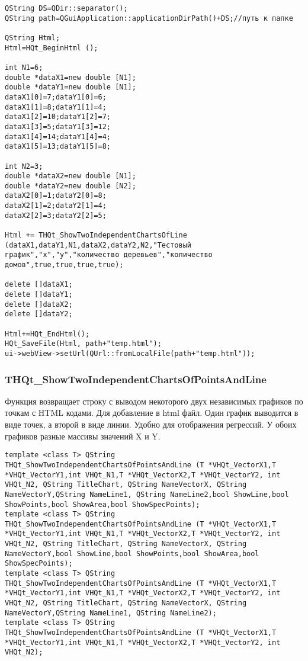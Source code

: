 \documentclass[a4paper,12pt]{article}
\begin{document}
\begin{lstlisting}[label=code_use_THQt_ShowTwoIndependentChartsOfLine,caption=Пример использования]
QString DS=QDir::separator();
QString path=QGuiApplication::applicationDirPath()+DS;//путь к папке

QString Html;
Html=HQt_BeginHtml ();

int N1=6;
double *dataX1=new double [N1];
double *dataY1=new double [N1];
dataX1[0]=7;dataY1[0]=6;
dataX1[1]=8;dataY1[1]=4;
dataX1[2]=10;dataY1[2]=7;
dataX1[3]=5;dataY1[3]=12;
dataX1[4]=14;dataY1[4]=4;
dataX1[5]=13;dataY1[5]=8;

int N2=3;
double *dataX2=new double [N1];
double *dataY2=new double [N2];
dataX2[0]=1;dataY2[0]=8;
dataX2[1]=2;dataY2[1]=4;
dataX2[2]=3;dataY2[2]=5;

Html += THQt_ShowTwoIndependentChartsOfLine (dataX1,dataY1,N1,dataX2,dataY2,N2,"Тестовый график","x","y","количество деревьев","количество домов",true,true,true,true);

delete []dataX1;
delete []dataY1;
delete []dataX2;
delete []dataY2;

Html+=HQt_EndHtml();
HQt_SaveFile(Html, path+"temp.html");
ui->webView->setUrl(QUrl::fromLocalFile(path+"temp.html"));
\end{lstlisting}

\subsubsection{THQt\_ShowTwoIndependentChartsOfPointsAndLine}\label{THQt_ShowTwoIndependentChartsOfPointsAndLine}

Функция возвращает строку с выводом некоторого двух независимых графиков по точкам с HTML кодами. Для добавление в html файл. Один график выводится в виде точек, а второй в виде линии. Удобно для отображения регрессий. У обоих графиков разные массивы значений X и Y.


\begin{lstlisting}[label=code_syntax_THQt_ShowTwoIndependentChartsOfPointsAndLine,caption=Синтаксис]
template <class T> QString THQt_ShowTwoIndependentChartsOfPointsAndLine (T *VHQt_VectorX1,T *VHQt_VectorY1,int VHQt_N1,T *VHQt_VectorX2,T *VHQt_VectorY2, int VHQt_N2, QString TitleChart, QString NameVectorX, QString NameVectorY,QString NameLine1, QString NameLine2,bool ShowLine,bool ShowPoints,bool ShowArea,bool ShowSpecPoints);
template <class T> QString THQt_ShowTwoIndependentChartsOfPointsAndLine (T *VHQt_VectorX1,T *VHQt_VectorY1,int VHQt_N1,T *VHQt_VectorX2,T *VHQt_VectorY2, int VHQt_N2, QString TitleChart, QString NameVectorX, QString NameVectorY,bool ShowLine,bool ShowPoints,bool ShowArea,bool ShowSpecPoints);
template <class T> QString THQt_ShowTwoIndependentChartsOfPointsAndLine (T *VHQt_VectorX1,T *VHQt_VectorY1,int VHQt_N1,T *VHQt_VectorX2,T *VHQt_VectorY2, int VHQt_N2, QString TitleChart, QString NameVectorX, QString NameVectorY,QString NameLine1, QString NameLine2);
template <class T> QString THQt_ShowTwoIndependentChartsOfPointsAndLine (T *VHQt_VectorX1,T *VHQt_VectorY1,int VHQt_N1,T *VHQt_VectorX2,T *VHQt_VectorY2, int VHQt_N2);
\end{lstlisting}
\end{document}

